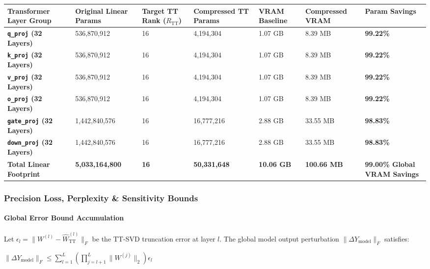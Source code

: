 \begin{center}
\begin{adjustbox}{max width=\columnwidth}
\renewcommand{\arraystretch}{1.2}
\begin{tabular}{lllllll}
\toprule
Transformer Layer Group & Original Linear Params & Target TT Rank ($R_{\text{TT}}$) & Compressed TT Params & VRAM Baseline & Compressed VRAM & Param Savings \\
\midrule
\textbf{\texttt{q\_proj} (32 Layers)} & 536,870,912 & 16 & 4,194,304 & 1.07 GB & 8.39 MB & \textbf{99.22\%} \\
\textbf{\texttt{k\_proj} (32 Layers)} & 536,870,912 & 16 & 4,194,304 & 1.07 GB & 8.39 MB & \textbf{99.22\%} \\
\textbf{\texttt{v\_proj} (32 Layers)} & 536,870,912 & 16 & 4,194,304 & 1.07 GB & 8.39 MB & \textbf{99.22\%} \\
\textbf{\texttt{o\_proj} (32 Layers)} & 536,870,912 & 16 & 4,194,304 & 1.07 GB & 8.39 MB & \textbf{99.22\%} \\
\textbf{\texttt{gate\_proj} (32 Layers)} & 1,442,840,576 & 16 & 16,777,216 & 2.88 GB & 33.55 MB & \textbf{98.83\%} \\
\textbf{\texttt{down\_proj} (32 Layers)} & 1,442,840,576 & 16 & 16,777,216 & 2.88 GB & 33.55 MB & \textbf{98.83\%} \\
\textbf{Total Linear Footprint} & \textbf{5,033,164,800} & \textbf{16} & \textbf{50,331,648} & \textbf{10.06 GB} & \textbf{100.66 MB} & \textbf{99.00\% Global VRAM Savings} \\

\bottomrule
\end{tabular}
\end{adjustbox}
\end{center}

\subsubsection*{Precision Loss, Perplexity \& Sensitivity Bounds}

\paragraph{Global Error Bound Accumulation}
Let $\epsilon_l = \|W^{(l)} - \hat{W}_{\text{TT}}^{(l)}\|_F$ be the TT-SVD truncation error at layer $l$. The global model output perturbation $\|\Delta Y_{\text{model}}\|_F$ satisfies:

\begin{center}
\begin{adjustbox}{max width=\columnwidth}
$\displaystyle
\|\Delta Y_{\text{model}}\|_F \le \sum_{l=1}^{L} \left( \prod_{j=l+1}^{L} \|W^{(j)}\|_2 \right) \epsilon_l
$
\end{adjustbox}
\end{center}

